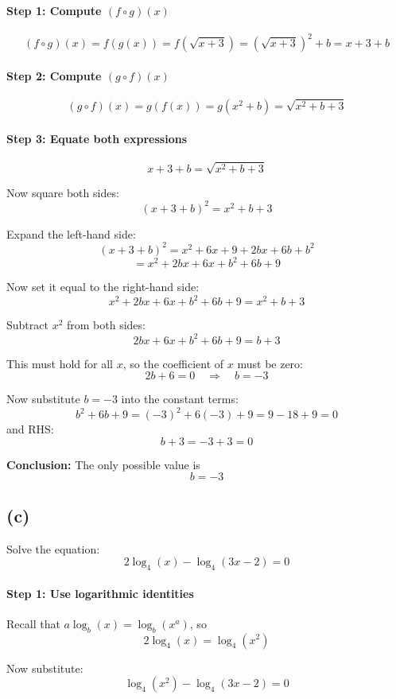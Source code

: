\documentclass{article}
\begin{document}
\paragraph{Step 1: Compute \( (f \circ g)(x) \)}
\[
(f \circ g)(x) = f(g(x)) = f(\sqrt{x + 3}) = (\sqrt{x + 3})^2 + b = x + 3 + b
\]

\paragraph{Step 2: Compute \( (g \circ f)(x) \)}
\[
(g \circ f)(x) = g(f(x)) = g(x^2 + b) = \sqrt{x^2 + b + 3}
\]

\paragraph{Step 3: Equate both expressions}
\[
x + 3 + b = \sqrt{x^2 + b + 3}
\]

Now square both sides:
\[
(x + 3 + b)^2 = x^2 + b + 3
\]

Expand the left-hand side:
\[
(x + 3 + b)^2 = x^2 + 6x + 9 + 2bx + 6b + b^2
\]
\[
= x^2 + 2bx + 6x + b^2 + 6b + 9
\]

Now set it equal to the right-hand side:
\[
x^2 + 2bx + 6x + b^2 + 6b + 9 = x^2 + b + 3
\]

Subtract \( x^2 \) from both sides:
\[
2bx + 6x + b^2 + 6b + 9 = b + 3
\]

This must hold for all \( x \), so the coefficient of \( x \) must be zero:
\[
2b + 6 = 0 \quad \Rightarrow \quad b = -3
\]

Now substitute \( b = -3 \) into the constant terms:
\[
b^2 + 6b + 9 = (-3)^2 + 6(-3) + 9 = 9 - 18 + 9 = 0
\]
and RHS:
\[
b + 3 = -3 + 3 = 0
\]

\textbf{Conclusion:} The only possible value is
\[
\boxed{b = -3}
\]

\subsection*{(c)}

Solve the equation:
\[
2\log_4(x) - \log_4(3x - 2) = 0
\]

\paragraph{Step 1: Use logarithmic identities}

Recall that \( a \log_b(x) = \log_b(x^a) \), so
\[
2\log_4(x) = \log_4(x^2)
\]

Now substitute:
\[
\log_4(x^2) - \log_4(3x - 2) = 0
\]
\end{document}
